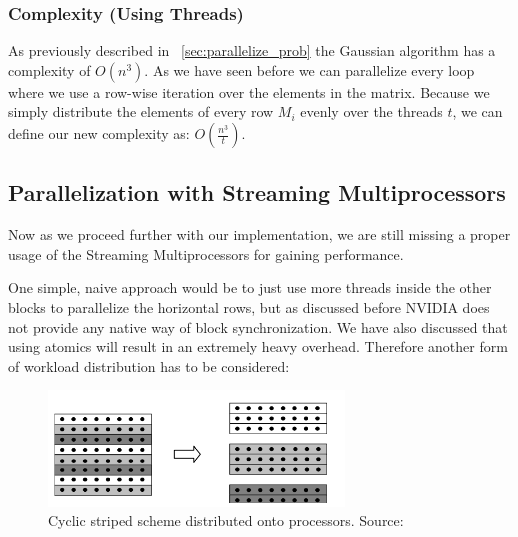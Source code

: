 \documentclass[draft, final]{vutinfth} %
\begin{document}
			\subsubsection{Complexity (Using Threads)}
				As previously described in ~\ref{sec:parallelize_prob} the Gaussian algorithm has a complexity of $O(n^3)$. As we have seen before we can parallelize every loop where we use a row-wise iteration over the elements in the matrix. Because we simply distribute the elements of every row $M_i$ evenly over the threads $t$, we can define our new complexity as: $O(\frac{n^3}{t})$.

		\subsection{Parallelization with Streaming Multiprocessors}
			Now as we proceed further with our implementation, we are still missing a proper usage of the Streaming Multiprocessors for gaining performance.

			One simple, naive approach would be to just use more threads inside the other blocks to parallelize the horizontal rows, but as discussed before NVIDIA does not provide any native way of block synchronization. We have also discussed that using atomics will result in an extremely heavy overhead. Therefore another form of workload distribution has to be considered:
			\begin{figure}[!ht]
			    \centering
			    \includegraphics[width=0.7\textwidth,keepaspectratio=true]{images/block_dist.PNG}
			    \caption{Cyclic striped scheme distributed onto processors. Source: \cite{parmeth}}
			    \label{fig:row_dist}
			\end{figure}
\end{document}
